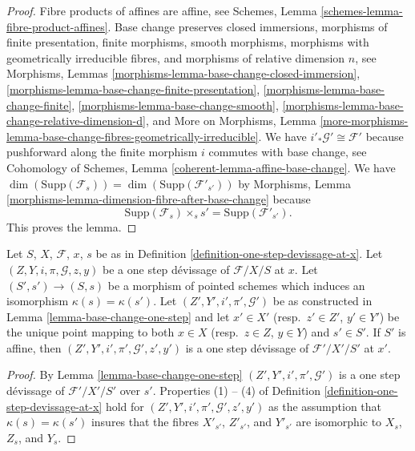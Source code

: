 \begin{proof}
Fibre products of affines are affine, see
Schemes, Lemma \ref{schemes-lemma-fibre-product-affines}.
Base change preserves
closed immersions,
morphisms of finite presentation,
finite morphisms,
smooth morphisms,
morphisms with geometrically irreducible fibres, and
morphisms of relative dimension $n$, see
Morphisms, Lemmas \ref{morphisms-lemma-base-change-closed-immersion},
\ref{morphisms-lemma-base-change-finite-presentation},
\ref{morphisms-lemma-base-change-finite},
\ref{morphisms-lemma-base-change-smooth},
\ref{morphisms-lemma-base-change-relative-dimension-d}, and
More on Morphisms, Lemma
\ref{more-morphisms-lemma-base-change-fibres-geometrically-irreducible}.
We have $i'_*\mathcal{G}' \cong \mathcal{F}'$ because pushforward
along the finite morphism $i$ commutes with base change, see
Cohomology of Schemes, Lemma \ref{coherent-lemma-affine-base-change}.
We have
$\dim(\text{Supp}(\mathcal{F}_s)) = \dim(\text{Supp}(\mathcal{F}'_{s'}))$
by
Morphisms, Lemma \ref{morphisms-lemma-dimension-fibre-after-base-change}
because
$$
\text{Supp}(\mathcal{F}_s) \times_s s' = \text{Supp}(\mathcal{F}'_{s'}).
$$
This proves the lemma.
\end{proof}

\begin{lemma}
\label{lemma-base-change-one-step-at-x}
Let $S$, $X$, $\mathcal{F}$, $x$, $s$ be as in
Definition \ref{definition-one-step-devissage-at-x}.
Let $(Z, Y, i, \pi, \mathcal{G}, z, y)$ be a one step d\'evissage
of $\mathcal{F}/X/S$ at $x$.
Let $(S', s') \to (S, s)$ be a morphism of pointed schemes
which induces an isomorphism $\kappa(s) = \kappa(s')$.
Let $(Z', Y', i', \pi', \mathcal{G}')$ be as constructed in
Lemma \ref{lemma-base-change-one-step}
and let $x' \in X'$ (resp.\ $z' \in Z'$, $y' \in Y'$) be the
unique point mapping to both $x \in X$ (resp.\ $z \in Z$, $y \in Y$)
and $s' \in S'$.
If $S'$ is affine, then $(Z', Y', i', \pi', \mathcal{G}', z', y')$
is a one step d\'evissage of $\mathcal{F}'/X'/S'$ at $x'$.
\end{lemma}

\begin{proof}
By
Lemma \ref{lemma-base-change-one-step}
$(Z', Y', i', \pi', \mathcal{G}')$ is a one step d\'evissage of
$\mathcal{F}'/X'/S'$ over $s'$. Properties (1) -- (4) of
Definition \ref{definition-one-step-devissage-at-x}
hold for $(Z', Y', i', \pi', \mathcal{G}', z', y')$
as the assumption that $\kappa(s) = \kappa(s')$ insures that the fibres
$X'_{s'}$, $Z'_{s'}$, and $Y'_{s'}$ are isomorphic to
$X_s$, $Z_s$, and $Y_s$.
\end{proof}

